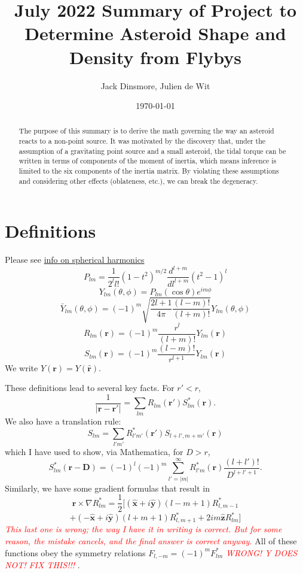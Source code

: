 \documentclass[aps,twocolumn,secnumarabic,balancelastpage,amsmath,amssymb,nofootinbib,floatfix]{revtex4-1}
\begin{document}
\title{July 2022 Summary of Project to Determine Asteroid Shape and Density from Flybys}
\author{Jack Dinsmore, Julien de Wit}
\date{\today}

\newcommand{\abs}[1]{\left| #1 \right|}
\newcommand{\parens}[1]{\left( #1 \right)}
\newcommand{\brackets}[1]{\left[ #1 \right]}
\newcommand{\comment}[1]{\textcolor{red}{\emph{ #1 }}}
\newcommand{\x}{\bm{\hat x}}
\newcommand{\y}{\bm{\hat y}}
\newcommand{\z}{\bm{\hat z}}
\newcommand{\J}{\mathcal{J}}
\newcommand{\M}{\mathcal{M}}
\newcommand{\R}{\mathcal{R}}





\begin{abstract}
    The purpose of this summary is to derive the math governing the way an asteroid reacts to a non-point source. It was motivated by the discovery that, under the assumption of a gravitating point source and a small asteroid, the tidal torque can be written in terms of components of the moment of inertia, which means inference is limited to the six components of the inertia matrix. By violating these assumptions and considering other effects (oblateness, etc.), we can break the degeneracy.
\end{abstract}

\maketitle



\section{Definitions}
Please see \href{https://citeseerx.ist.psu.edu/viewdoc/download?doi=10.1.1.56.5257&rep=rep1&type=pdf}{info on spherical harmonics}
$$P_{lm}=\frac{1}{2^ll!}(1-t^2)^{m/2} \frac{d^{l+m}}{dl^{l+m}}(t^2-1)^l$$
$$Y_{lm}(\theta, \phi) = P_{lm}(\cos\theta)e^{im\phi}$$
$$\bar Y_{lm}(\theta, \phi) = (-1)^m \sqrt{\frac{2l+1}{4\pi}\frac{(l-m)!}{(l+m)!}} Y_{lm}(\theta, \phi)$$
$$R_{lm}(\bm r) = (-1)^m \frac{r^l}{(l+m)!}Y_{lm}(\bm r)$$
$$S_{lm}(\bm r) = (-1)^m \frac{(l-m)!}{r^{l+1}}Y_{lm}(\bm r)$$
We write $Y(\bm r)=Y(\hat{\bm r})$.

These definitions lead to several key facts. For $r' < r$,
$$\frac{1}{|\bm r - \bm r'|}=\sum_{lm}R_{lm}(\bm r')S^*_{lm}(\bm r).$$
We also have a translation rule:
$$S_{lm}=\sum_{l'm'}R^*_{l'm'}(\bm r')S_{l+l',m+m'}(\bm r)$$
which I have used to show, via Mathematica, for $D > r$,
$$S_{lm}^*(\bm r - \bm D)=(-1)^l (-1)^m \sum_{l'=|m|}^\infty R_{l'm}^*(\bm r) \frac{(l+l')!}{D^{l+l'+1}}.$$
Similarly, we have some gradient formulas that result in
$$\bm r \times \nabla R_{lm}^*=\frac{1}{2}[(\x + i\y)(l-m+1)R^*_{l,m-1}$$
$$+(-\x+i\y)(l+m+1)R^*_{l,m+1}+2im\z R^*_{lm}]$$
\comment{This last one is wrong; the way I have it in writing is correct. But for some reason, the mistake cancels, and the final answer is correct anyway.}
All of these functions obey the symmetry relations $F_{l,-m}=(-1)^mF_{lm}^*$
\comment{WRONG! Y DOES NOT! FIX THIS!!!}.
\end{document}
